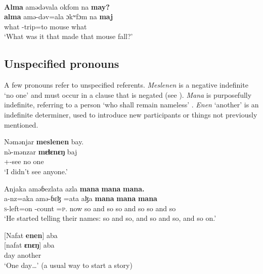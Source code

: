 \noindent\parbox{\textwidth}{\ea \label{ex:3:42}\\
\textbf{Alma}  amədəvala  okfom  na  \textbf{may?}\\
\gll  \textbf{alma}  amə-dəv=ala    ɔkʷfɔm  na  \textbf{maj}\\
      what  {\DEP}-trip=to    mouse  {\PSP}  what\\
\glt  ‘What was it that made that mouse fall?’
\z}

\subsection{Unspecified pronouns}\label{sec:3.1.5}
\hypertarget{RefHeading1210921525720847}{}
A few pronouns refer to unspecified referents.  \textit{Meslenen} is a negative indefinite ‘no one’  and must occur in a clause that is negated (see ). \textit{Mana} is purposefully indefinite, referring to a person ‘who shall remain nameless’ .  \textit{ Enen} ‘another’  is an indefinite determiner, used to introduce new participants or things not previously mentioned.

\ea \label{ex:3:43}
Nəmənjar  \textbf{meslenen} bay.\\
\gll  n\`{ə}-mənzar     \textbf{mɛɬɛnɛŋ}    baj\\
      {\oneS}+{\PFV}-see    {no one}    {\NEG}\\
\glt  ‘I didn’t see anyone.’
\z

\ea \label{ex:3:44}
Anjaka  aməɓezlata  azla  \textbf{mana}  \textbf{mana}  \textbf{mana.}  \\
\gll  a-nz=aka  amə-ɓɛɮ    =ata   aɮa    \textbf{mana}    \textbf{mana}    \textbf{mana}  \\
      \textsc{s}-left=on  {\DEP}-count  =\textsc{p}.{\IO}  now  {so and so} {so and so} {so and so}\\
\glt  ‘He started telling their names: so and so, and so and so, and so on.’  
\z

\ea \label{ex:3:45}{}
{}[Nafat  \textbf{enen}] aba\\
\gll  {}[nafat  \textbf{ɛnɛŋ}]  aba\\
      day    another  {\EXT}\\
\glt  ‘One day\ldots’  (a usual way to start a story)
\z

